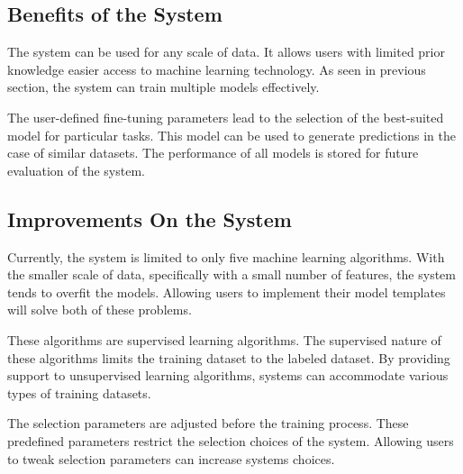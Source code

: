 \subsection{Benefits of the System}\label{subsec:benefits_of_system}

The system can be used for any scale of data. It allows users with limited prior knowledge easier access to machine learning technology. As seen in previous section, the system can train multiple models effectively.

The user-defined fine-tuning parameters lead to the selection of the best-suited model for particular tasks. This model can be used to generate predictions in the case of similar datasets. The performance of all models is stored for future evaluation of the system.

\subsection{Improvements On the System}\label{subsec:improvements_on_system}

Currently, the system is limited to only five machine learning algorithms. With the smaller scale of data, specifically with a small number of features, the system tends to overfit the models.  Allowing users to implement their model templates will solve both of these problems.

These algorithms are supervised learning algorithms. The supervised nature of these algorithms limits the training dataset to the labeled dataset. By providing support to unsupervised learning algorithms, systems can accommodate various types of training datasets.

The selection parameters are adjusted before the training process. These predefined parameters restrict the selection choices of the system. Allowing users to tweak selection parameters can increase systems choices.
